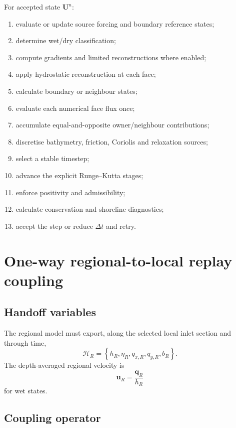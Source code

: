 \documentclass[11pt,a4paper]{article}
\newcommand{\vect}[1]{\bm{#1}}
\begin{document}
For accepted state $\vect U^n$:
\begin{enumerate}
  \item evaluate or update source forcing and boundary reference states;
  \item determine wet/dry classification;
  \item compute gradients and limited reconstructions where enabled;
  \item apply hydrostatic reconstruction at each face;
  \item calculate boundary or neighbour states;
  \item evaluate each numerical face flux once;
  \item accumulate equal-and-opposite owner/neighbour contributions;
  \item discretise bathymetry, friction, Coriolis and relaxation sources;
  \item select a stable timestep;
  \item advance the explicit Runge--Kutta stages;
  \item enforce positivity and admissibility;
  \item calculate conservation and shoreline diagnostics;
  \item accept the step or reduce $\Delta t$ and retry.
\end{enumerate}

\section{One-way regional-to-local replay coupling}

\subsection{Handoff variables}

The regional model must export, along the selected local inlet section and through time,
\begin{equation}
  \mathcal H_R=
  \left\{h_R,\eta_R,q_{x,R},q_{y,R},b_R\right\}.
\end{equation}
The depth-averaged regional velocity is
\begin{equation}
  \vect u_R=\frac{\vect q_R}{h_R}
\end{equation}
for wet states.

\subsection{Coupling operator}
\end{document}

